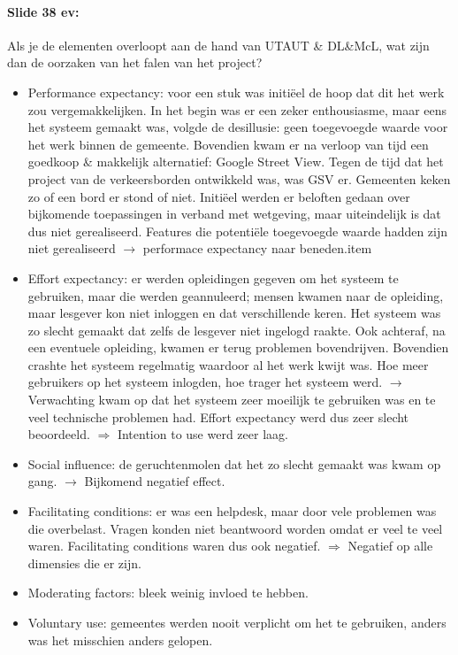 \documentclass[10pt,a4paper]{report}
\begin{document}
\paragraph{Slide 38 ev:}Als je de elementen overloopt aan de hand van UTAUT \& DL\&McL, wat zijn dan de oorzaken van het falen van het project?
\begin{itemize}
\item Performance expectancy: voor een stuk was initiëel de hoop dat dit het werk zou vergemakkelijken. In het begin was er een zeker enthousiasme, maar eens het systeem gemaakt was, volgde de desillusie: geen toegevoegde waarde voor het werk binnen de gemeente. Bovendien kwam er na verloop van tijd een goedkoop \& makkelijk alternatief: Google Street View. Tegen de tijd dat het project van de verkeersborden ontwikkeld was, was GSV er. Gemeenten keken zo of een bord er stond of niet. Initiëel werden er beloften gedaan over bijkomende toepassingen in verband met wetgeving, maar uiteindelijk is dat dus niet gerealiseerd. Features die potentiële toegevoegde waarde hadden zijn niet gerealiseerd $\rightarrow$ performace expectancy naar beneden.item
\item Effort expectancy: er werden opleidingen gegeven om het systeem te gebruiken, maar die werden geannuleerd; mensen kwamen naar de opleiding, maar lesgever kon niet inloggen en dat verschillende keren. Het systeem was zo slecht gemaakt dat zelfs de lesgever niet ingelogd raakte. Ook achteraf, na een eventuele opleiding, kwamen er terug problemen bovendrijven. Bovendien crashte het systeem regelmatig waardoor al het werk kwijt was. Hoe meer gebruikers op het systeem inlogden, hoe trager het systeem werd. $\rightarrow$ Verwachting kwam op dat het systeem zeer moeilijk te gebruiken was en te veel technische problemen had. Effort expectancy werd dus zeer slecht beoordeeld. $\Rightarrow$ Intention to use werd zeer laag.
\item Social influence: de geruchtenmolen dat het zo slecht gemaakt was kwam op gang. $\rightarrow$ Bijkomend negatief effect.
\item Facilitating conditions: er was een helpdesk, maar door vele problemen was die overbelast. Vragen konden niet beantwoord worden omdat er veel te veel waren. Facilitating conditions waren dus ook negatief. $\Rightarrow$ Negatief op alle dimensies die er zijn.
\item Moderating factors: bleek weinig invloed te hebben.
\item Voluntary use: gemeentes werden nooit verplicht om het te gebruiken, anders was het misschien anders gelopen. 
\end{itemize}
\end{document}
